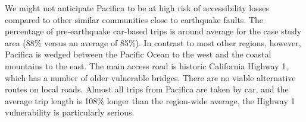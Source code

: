 

We might not anticipate Pacifica to be at high risk of accessibility losses compared to other similar communities close to earthquake faults. The percentage of pre-earthquake car-based trips is around average for the case study area (88\% versus an average of 85\%). 
In contrast to most other regions, however, Pacifica is wedged between the Pacific Ocean to the west and the coastal mountains to the east. The main access road is historic California Highway 1, which has a number of older vulnerable bridges. There are no viable alternative routes on local roads. Almost all trips from Pacifica are taken by car, and the average trip length is 108\% longer than the region-wide average, the Highway 1 vulnerability is particularly serious.

